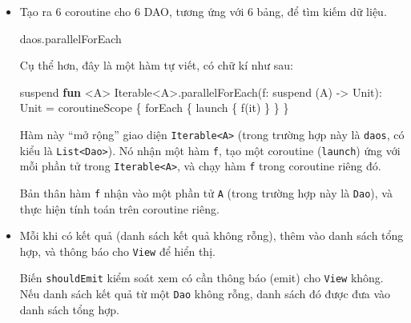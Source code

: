 \documentclass[
]{article}
\newenvironment{Shaded}{}{}
\newcommand{\DataTypeTok}[1]{\textcolor[rgb]{0.56,0.13,0.00}{#1}}
\newcommand{\FunctionTok}[1]{\textcolor[rgb]{0.02,0.16,0.49}{#1}}
\newcommand{\KeywordTok}[1]{\textcolor[rgb]{0.00,0.44,0.13}{\textbf{#1}}}
\newcommand{\NormalTok}[1]{#1}
\newcommand{\OperatorTok}[1]{\textcolor[rgb]{0.40,0.40,0.40}{#1}}
\newcommand{\VariableTok}[1]{\textcolor[rgb]{0.10,0.09,0.49}{#1}}
\begin{document}
\begin{itemize}
\item
  Tạo ra 6 coroutine cho 6 DAO, tương ứng với 6 bảng, để tìm kiếm dữ
  liệu.

\begin{Shaded}
\begin{Highlighting}[]
\NormalTok{daos}\OperatorTok{.}\NormalTok{parallelForEach}
\end{Highlighting}
\end{Shaded}

  Cụ thể hơn, đây là một hàm tự viết, có chữ kí như sau:

\begin{Shaded}
\begin{Highlighting}[]
\NormalTok{suspend }\KeywordTok{fun} \OperatorTok{\textless{}}\DataTypeTok{A}\OperatorTok{\textgreater{}} \FunctionTok{Iterable}\OperatorTok{\textless{}}\DataTypeTok{A}\OperatorTok{\textgreater{}.}\FunctionTok{parallelForEach}\OperatorTok{(}\VariableTok{f}\OperatorTok{:} \DataTypeTok{suspend}\NormalTok{ (}\VariableTok{A}\OperatorTok{)}\NormalTok{ {-}\textgreater{} }\FunctionTok{Unit}\NormalTok{)}\OperatorTok{:} \DataTypeTok{Unit} \OperatorTok{=}
\NormalTok{    coroutineScope }\OperatorTok{\{}\NormalTok{ forEach }\OperatorTok{\{}\NormalTok{ launch }\OperatorTok{\{}\NormalTok{ f}\OperatorTok{(}\NormalTok{it}\OperatorTok{)} \OperatorTok{\}} \OperatorTok{\}} \OperatorTok{\}}
\end{Highlighting}
\end{Shaded}

  Hàm này ``mở rộng'' giao diện
  \texttt{Iterable\textless{}A\textgreater{}} (trong trường hợp này là
  \texttt{daos}, có kiểu là \texttt{List\textless{}Dao\textgreater{}}).
  Nó nhận một hàm \texttt{f}, tạo một coroutine (\texttt{launch}) ứng
  với mỗi phần tử trong \texttt{Iterable\textless{}A\textgreater{}}, và
  chạy hàm \texttt{f} trong coroutine riêng đó.

  Bản thân hàm \texttt{f} nhận vào một phần tử \texttt{A} (trong trường
  hợp này là \texttt{Dao}), và thực hiện tính toán trên coroutine riêng.
\item
  Mỗi khi có kết quả (danh sách kết quả không rỗng), thêm vào danh sách
  tổng hợp, và thông báo cho \texttt{View} để hiển thị.

  Biến \texttt{shouldEmit} kiểm soát xem có cần thông báo (emit) cho
  \texttt{View} không. Nếu danh sách kết quả từ một \texttt{Dao} không
  rỗng, danh sách đó được đưa vào danh sách tổng hợp.


\end{itemize}
\end{document}
